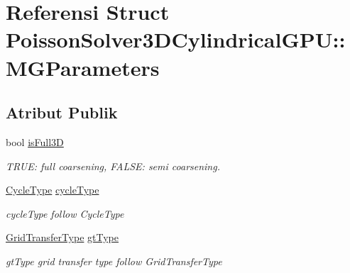 \hypertarget{structPoissonSolver3DCylindricalGPU_1_1MGParameters}{}\section{Referensi Struct Poisson\+Solver3\+D\+Cylindrical\+G\+PU\+:\+:M\+G\+Parameters}
\label{structPoissonSolver3DCylindricalGPU_1_1MGParameters}
\subsection*{Atribut Publik}
\begin{DoxyCompactItemize}
\item 
\hypertarget{structPoissonSolver3DCylindricalGPU_1_1MGParameters_a5ca106c524b11e9c5eba571103696410}{}\label{structPoissonSolver3DCylindricalGPU_1_1MGParameters_a5ca106c524b11e9c5eba571103696410} 
bool \hyperlink{structPoissonSolver3DCylindricalGPU_1_1MGParameters_a5ca106c524b11e9c5eba571103696410}{is\+Full3D}
\begin{DoxyCompactList}\small\item\em T\+R\+UE\+: full coarsening, F\+A\+L\+SE\+: semi coarsening. \end{DoxyCompactList}\item 
\hypertarget{structPoissonSolver3DCylindricalGPU_1_1MGParameters_a88f0b2fb22b2ffa51c82d9b77ec40c5f}{}\label{structPoissonSolver3DCylindricalGPU_1_1MGParameters_a88f0b2fb22b2ffa51c82d9b77ec40c5f} 
\hyperlink{classPoissonSolver3DCylindricalGPU_adb48f4d0173159081f19f859bb3c0ffc}{Cycle\+Type} \hyperlink{structPoissonSolver3DCylindricalGPU_1_1MGParameters_a88f0b2fb22b2ffa51c82d9b77ec40c5f}{cycle\+Type}
\begin{DoxyCompactList}\small\item\em cycle\+Type follow Cycle\+Type \end{DoxyCompactList}\item 
\hypertarget{structPoissonSolver3DCylindricalGPU_1_1MGParameters_aecb03fece0f04b5446faac09f01ce760}{}\label{structPoissonSolver3DCylindricalGPU_1_1MGParameters_aecb03fece0f04b5446faac09f01ce760} 
\hyperlink{classPoissonSolver3DCylindricalGPU_a7c0e6e2afb797759e24d961e30562244}{Grid\+Transfer\+Type} \hyperlink{structPoissonSolver3DCylindricalGPU_1_1MGParameters_aecb03fece0f04b5446faac09f01ce760}{gt\+Type}
\begin{DoxyCompactList}\small\item\em gt\+Type grid transfer type follow Grid\+Transfer\+Type \end{DoxyCompactList}\item 

\end{DoxyCompactItemize}
